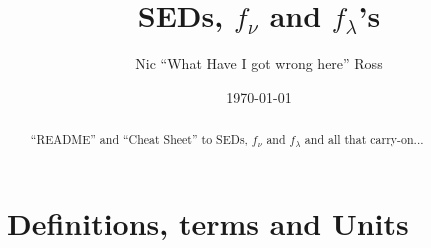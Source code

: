 \documentclass[11pt,a4paper]{article}
\begin{document}
\title{SEDs, $f_{\nu}$ and $f_{\lambda}$'s}
\author{Nic ``What Have I got wrong here'' Ross}
\date{\today}
\maketitle



\begin{abstract}
``README'' and ``Cheat Sheet'' to SEDs, $f_{\nu}$ and $f_{\lambda}$ and all that carry-on...
\end{abstract}


\section{Definitions, terms and Units}

\end{document}
